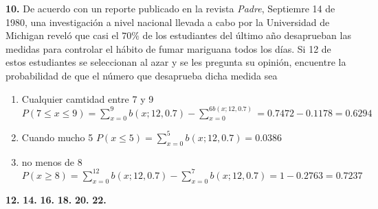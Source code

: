 \documentclass[12pt, letterpaper]{article}
\begin{document}
    \textbf{10. }De acuerdo con un reporte publicado en la revista \textit{Padre}, Septiemre 14 de 1980, una investigación
    a nivel nacional llevada a cabo por la Universidad de Michigan reveló que casi el $70\%$ de los estudiantes del
    último año desaprueban las medidas para controlar el hábito de fumar mariguana todos los días. Si 12 de estos
    estudiantes se seleccionan al azar y se les pregunta su opinión, encuentre la probabilidad de que el número que
    desaprueba dicha medida sea
    \begin{enumerate}
        \item Cualquier camtidad entre 7 y 9
            $P(7\leq x\leq 9)=\displaystyle\sum_{x=0}^{9}b(x;12,0.7)-\sum_{x=0}^{6b(x;12,0.7)}=0.7472-0.1178=0.6294$
        \item Cuando mucho 5
            $P(x\leq 5)=\displaystyle\sum_{x=0}^{5}b(x;12,0.7)=0.0386$
        \item no menos de 8
            $P(x\geq 8)=\displaystyle\sum_{x=0}^{12}b(x;12,0.7)-\sum_{x=0}^{7}b(x;12,0.7)=1-0.2763=0.7237$
    \end{enumerate}\vskip1cm

    \textbf{12. }\vskip1cm
    \textbf{14. }\vskip1cm
    \textbf{16. }\vskip1cm
    \textbf{18. }\vskip1cm
    \textbf{20. }\vskip1cm
    \textbf{22. }\vskip1cm
\end{document}
